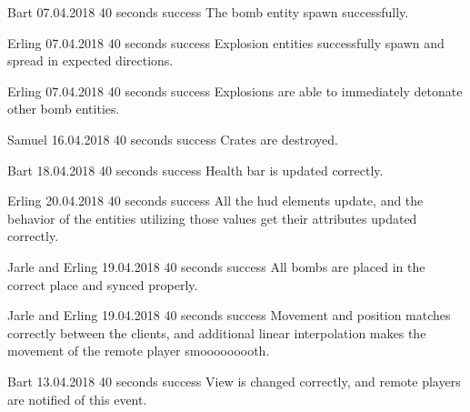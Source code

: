{Bart}
{07.04.2018}
{40 seconds}
{success}
{The bomb entity spawn successfully.}

{Erling}
{07.04.2018}
{40 seconds}
{success}
{Explosion entities successfully spawn and spread in expected directions.}

{Erling}
{07.04.2018}
{40 seconds}
{success}
{Explosions are able to immediately detonate other bomb entities.}

{Samuel}
{16.04.2018}
{40 seconds}
{success}
{Crates are destroyed.}

{Bart}
{18.04.2018}
{40 seconds}
{success}
{Health bar is updated correctly.}

{Erling}
{20.04.2018}
{40 seconds}
{success}
{All the \gls{hud} elements update, and the behavior of the entities utilizing those values get their attributes updated correctly.}

{Jarle and Erling}
{19.04.2018}
{40 seconds}
{success}
{All bombs are placed in the correct place and synced properly.}

{Jarle and Erling}
{19.04.2018}
{40 seconds}
{success}
{Movement and position matches correctly between the clients, and additional linear interpolation makes the movement of the remote player smooooooooth.}

{Bart}
{13.04.2018}
{40 seconds}
{success}
{View is changed correctly, and remote players are notified of this event.}

